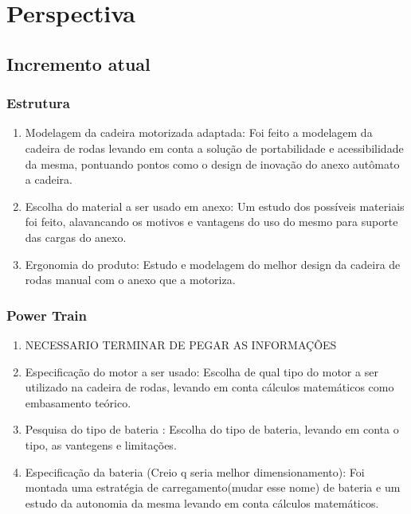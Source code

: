 \chapter[Perspectiva]{Perspectiva}

\section{Incremento atual}
  \subsection{Estrutura}
    \begin{enumerate}
      \item Modelagem da cadeira motorizada adaptada: Foi feito a modelagem da cadeira de rodas levando em conta a solução de portabilidade e acessibilidade da mesma, pontuando pontos como o design de inovação do anexo autômato a cadeira.

      \item Escolha do material a ser usado em anexo: Um estudo dos possíveis materiais foi feito, alavancando os motivos e vantagens do uso do mesmo para suporte das cargas do anexo.

      \item Ergonomia do produto: Estudo e modelagem do melhor design da cadeira de rodas manual com o anexo que a motoriza.
    \end{enumerate}
  \subsection{Power Train}
    \begin{enumerate}
      \item NECESSARIO TERMINAR DE PEGAR AS INFORMAÇÕES
      \item Especificação do motor a ser usado: Escolha de qual tipo do motor a ser utilizado na cadeira de rodas, levando em conta cálculos matemáticos como embasamento teórico.

      \item Pesquisa do tipo de bateria : Escolha do tipo de bateria, levando em conta o tipo, as vantegens e limitações.

      \item Especificação da bateria (Creio q seria melhor dimensionamento): Foi montada uma estratégia de carregamento(mudar esse nome) de bateria e um estudo da autonomia da mesma levando em conta cálculos matemáticos.
    \end{enumerate}

